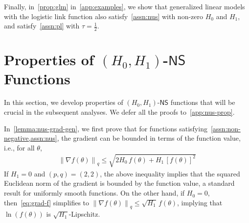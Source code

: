 \documentclass{article}
\newcommand{\norm}[1]{\left\|#1 \right\|}
\newcommand{\NS}{\textsf{NS}}
\begin{document}
Finally, in~\cref{prop:glm} in~\cref{app:examples}, we show that generalized linear models with the logistic link function also satisfy~\cref{assn:nus} with non-zero $H_0$ and $H_1$, and satisfy~\cref{assn:pl} with $\tau = \frac{1}{2}$. 
\section{Properties of $(H_0, H_1)$-$\NS$ Functions}
\label{sec:nus-structure}
In this section, we develop properties of $(H_0, H_1)$-$\NS$ functions that will be crucial in the subsequent analyses. We defer all the proofs to~\cref{app:nus-prop}. 

In~\cref{lemma:nus-grad-gen}, we first prove that for functions satisfying~\cref{assn:non-negative,assn:nus}, the gradient can be bounded in terms of the function value, i.e., for all $\theta$, 
\begin{align}
\norm{\nabla f(\theta)}_{q} \leq \sqrt{2 H_0 \, f(\theta) + H_1 \, [f(\theta)]^2}  \label{eq:grad-f}
\end{align}
If $H_1 = 0$ and $(p,q) = (2,2)$, the above inequality implies that the squared Euclidean norm of the gradient is bounded by the function value, a standard result for uniformly smooth functions. On the other hand, if $H_0 = 0$, then~\cref{eq:grad-f} simplifies to $\norm{\nabla f(\theta)}_q \leq \sqrt{H_1} \, f(\theta)$, implying that $\ln(f(\theta))$ is $\sqrt{H_1}$-Lipschitz. 
\end{document}
